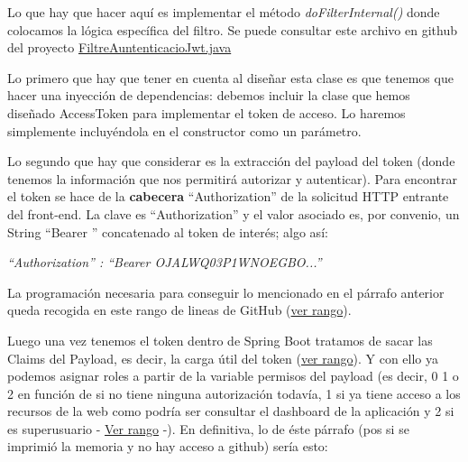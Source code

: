\documentclass[a4paper,12pt]{report}
\begin{document}
		Lo que hay que hacer aquí es implementar el método \textit{doFilterInternal()} donde colocamos la lógica específica del filtro. Se puede consultar este archivo en github del proyecto \href{https://github.com/blackcub3s/mercApp/blob/main/APP%20WEB/__springboot__produccio__/app/src/main/java/miApp/app/seguretat/FiltreAutenticacioJwt.java}{FiltreAuntenticacioJwt.java}
		
		Lo primero que hay que tener en cuenta al diseñar esta clase es que tenemos que hacer una inyección de dependencias: debemos incluir la clase que hemos diseñado AccessToken para implementar el token de acceso. Lo haremos simplemente incluyéndola en el constructor como un parámetro.
		
		Lo segundo que hay que considerar es la extracción del payload del token (donde tenemos la información que nos permitirá autorizar y autenticar). Para encontrar el token se hace de la \textbf{cabecera} ``Authorization'' de la solicitud HTTP entrante del front-end. La clave es ``Authorization'' y el valor asociado es, por convenio, un String ``Bearer '' concatenado al token de interés; algo así:
		

		
		\FloatBarrier
		\begin{table}[h]
				\centering
 				\textit{``Authorization'' : ``Bearer OJALWQ03P1WNOEGBO...''}
		\end{table}
		\FloatBarrier
		

		 
		  La programación necesaria para conseguir lo mencionado en el párrafo anterior queda recogida en este rango de lineas de GitHub (\href{https://github.com/blackcub3s/mercApp/blob/89efcf854d8bbab2addde3f7e817eb97f7737b95/APP%20WEB/__springboot__produccio__/app/src/main/java/miApp/app/seguretat/FiltreAutenticacioJwt.java#L33-L43}{ver rango}). 
		  
		  Luego una vez tenemos el token dentro de Spring Boot tratamos de sacar las Claims del Payload, es decir, la carga útil del token (\href{https://github.com/blackcub3s/mercApp/blob/89efcf854d8bbab2addde3f7e817eb97f7737b95/APP%20WEB/__springboot__produccio__/app/src/main/java/miApp/app/seguretat/FiltreAutenticacioJwt.java#L50-L54}{ver rango}). Y con ello ya podemos asignar roles a partir de la variable permisos del payload (es decir, 0 1 o 2 en función de si no tiene ninguna autorización todavía, 1 si ya tiene acceso a los recursos de la web como podría ser consultar el dashboard de la aplicación y 2 si es superusuario - \href{https://github.com/blackcub3s/mercApp/blob/89efcf854d8bbab2addde3f7e817eb97f7737b95/APP%20WEB/__springboot__produccio__/app/src/main/java/miApp/app/seguretat/FiltreAutenticacioJwt.java#L56-L66}{Ver rango} -). En definitiva, lo de éste párrafo (pos si se imprimió la memoria y no hay acceso a github) sería esto:
		  
\end{document}
